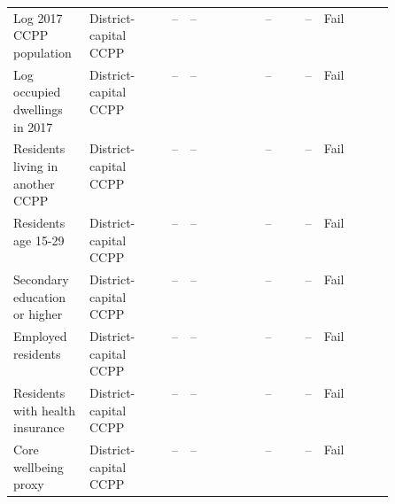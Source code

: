 \begin{longtable}{@{}p{0.20\linewidth}p{0.16\linewidth}rp{0.14\linewidth}rrl@{}}
Log 2017 CCPP population & District-capital CCPP & -- & -- & -- & -- & Fail \\
Log occupied dwellings in 2017 & District-capital CCPP & -- & -- & -- & -- & Fail \\
Residents living in another CCPP & District-capital CCPP & -- & -- & -- & -- & Fail \\
Residents age 15-29 & District-capital CCPP & -- & -- & -- & -- & Fail \\
Secondary education or higher & District-capital CCPP & -- & -- & -- & -- & Fail \\
Employed residents & District-capital CCPP & -- & -- & -- & -- & Fail \\
Residents with health insurance & District-capital CCPP & -- & -- & -- & -- & Fail \\
Core wellbeing proxy & District-capital CCPP & -- & -- & -- & -- & Fail \\
\end{longtable}
\endgroup

